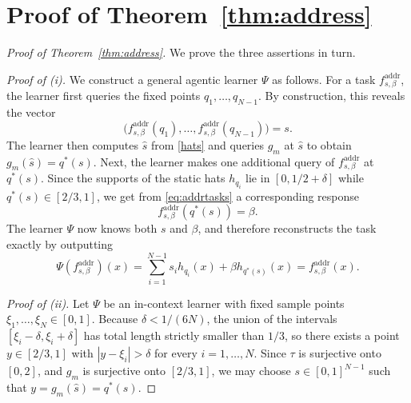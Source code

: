 \documentclass{article}
\begin{document}
\section{Proof of Theorem~\ref{thm:address}} \label{appx:address}

\begin{proof}[Proof of Theorem~\ref{thm:address}]
We prove the three assertions in turn.

\medskip
\noindent
\emph{Proof of (i).}
We construct a general agentic learner $\Psi$ as follows.
For a task $f^{\mathrm{addr}}_{s,\beta}$, the %
learner first queries the fixed points $q_1,\dots,q_{N-1}$. By construction,
this reveals the vector
\[
\bigl(f^{\mathrm{addr}}_{s,\beta}(q_1),\dots,f^{\mathrm{addr}}_{s,\beta}(q_{N-1})\bigr)=s.
\]
The learner then computes $\widehat s$ from \eqref{hats} and queries $g_m$ at $\widehat s$ to obtain
$
    g_m(\widehat s)=q^\ast(s)
$.
Next, the learner makes one additional query of $f^{\mathrm{addr}}_{s,\beta}$ at $q^\ast(s)$. 
Since the supports of the static hats $h_{q_i}$ lie in $[0,1/2+\delta]$
while $q^\ast(s)\in[2/3,1]$, we get from \eqref{eq:addrtasks} a corresponding response
\[
    f^{\mathrm{addr}}_{s,\beta}(q^\ast(s))=\beta.
\]
The learner $\Psi$ now knows both $s$ and $\beta$, and therefore reconstructs the task exactly by
outputting
\[
\Psi(f^{\mathrm{addr}}_{s,\beta})(x)
=\sum_{i=1}^{N-1} s_i h_{q_i}(x)+\beta h_{q^\ast(s)}(x) = f^{\mathrm{addr}}_{s,\beta}(x).
\]

\medskip
\noindent
\emph{Proof of (ii).}
Let $\Psi$ be an in-context learner with fixed sample points $\xi_1,\dots,\xi_N\in[0,1]$.
Because $\delta<1/(6N)$, the union of the intervals $[\xi_i-\delta,\xi_i+\delta]$ has total length
strictly smaller than $1/3$, so there exists a point $y\in[2/3,1]$ with
$|y-\xi_i|>\delta$ for every $i=1,\dots,N$.
Since $\tau$ is surjective onto $[0,2]$, and $g_m$ is surjective onto $[2/3,1]$, we may choose $s\in[0,1]^{N-1}$ such that $y=g_m(\widehat s)=q^\ast(s)$.


\end{proof}
\end{document}
